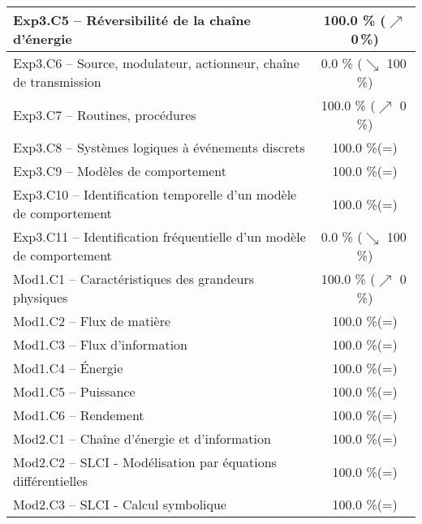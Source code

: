 \begin{center}
\begin{tabular}{|p{.7\linewidth}|c|}
Exp3.C5 -- Réversibilité de la chaîne d’énergie&100.0 \% ($\nearrow$ 0\,\%)\\ \hline 
Exp3.C6 -- Source, modulateur, actionneur, chaîne de transmission&0.0 \% ($\searrow$ 100\,\%)\\ \hline 
Exp3.C7 -- Routines, procédures &100.0 \% ($\nearrow$ 0\,\%)\\ \hline 
Exp3.C8 -- Systèmes logiques à événements discrets&100.0 \%(=)\\ \hline 
Exp3.C9 -- Modèles de comportement&100.0 \%(=)\\ \hline 
Exp3.C10 -- Identification temporelle d’un modèle de comportement&100.0 \%(=)\\ \hline 
Exp3.C11 -- Identification fréquentielle d’un modèle de comportement&0.0 \% ($\searrow$ 100\,\%)\\ \hline 
Mod1.C1 -- Caractéristiques des grandeurs physiques&100.0 \% ($\nearrow$ 0\,\%)\\ \hline 
Mod1.C2 -- Flux de matière&100.0 \%(=)\\ \hline 
Mod1.C3 -- Flux d’information&100.0 \%(=)\\ \hline 
Mod1.C4 -- Énergie&100.0 \%(=)\\ \hline 
Mod1.C5 -- Puissance&100.0 \%(=)\\ \hline 
Mod1.C6 -- Rendement&100.0 \%(=)\\ \hline 
Mod2.C1 -- Chaîne d’énergie et d'information&100.0 \%(=)\\ \hline 
Mod2.C2 -- SLCI - Modélisation par équations différentielles&100.0 \%(=)\\ \hline 
Mod2.C3 -- SLCI - Calcul symbolique&100.0 \%(=)\\ \hline 
\end{tabular} 
\end{center} 
\normalsize 
 
